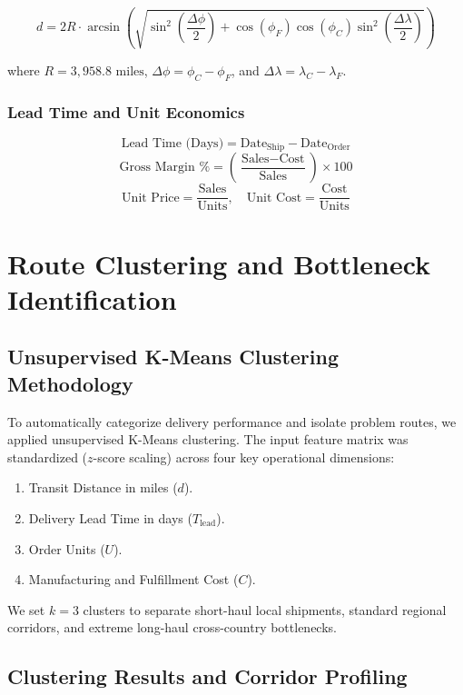 \documentclass[12pt]{article}
\begin{document}
$$d = 2 R \cdot \arcsin \left( \sqrt{\sin^2\left(\frac{\Delta\phi}{2}\right) + \cos(\phi_F)\cos(\phi_C)\sin^2\left(\frac{\Delta\lambda}{2}\right)} \right)$$

where $R = 3,958.8\text{ miles}$, $\Delta\phi = \phi_C - \phi_F$, and $\Delta\lambda = \lambda_C - \lambda_F$.

\subsubsection{Lead Time and Unit Economics}
$$\text{Lead Time (Days)} = \text{Date}_{\text{Ship}} - \text{Date}_{\text{Order}}$$
$$\text{Gross Margin } \% = \left(\frac{\text{Sales} - \text{Cost}}{\text{Sales}}\right) \times 100$$
$$\text{Unit Price} = \frac{\text{Sales}}{\text{Units}}, \quad \text{Unit Cost} = \frac{\text{Cost}}{\text{Units}}$$

\newpage

\section{Route Clustering and Bottleneck Identification}

\subsection{Unsupervised K-Means Clustering Methodology}

To automatically categorize delivery performance and isolate problem routes, we applied unsupervised K-Means clustering. The input feature matrix was standardized ($z$-score scaling) across four key operational dimensions:
\begin{enumerate}
    \item Transit Distance in miles ($d$).
    \item Delivery Lead Time in days ($T_{\text{lead}}$).
    \item Order Units ($U$).
    \item Manufacturing and Fulfillment Cost ($C$).
\end{enumerate}

We set $k=3$ clusters to separate short-haul local shipments, standard regional corridors, and extreme long-haul cross-country bottlenecks.

\subsection{Clustering Results and Corridor Profiling}
\end{document}
